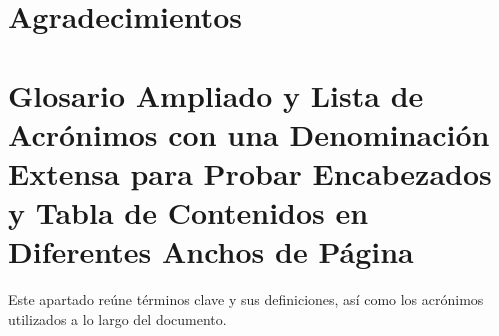 \chapter{Agradecimientos}

\chapter*{Glosario Ampliado y Lista de Acrónimos con una Denominación Extensa para Probar Encabezados y Tabla de Contenidos en Diferentes Anchos de Página}
Este apartado reúne términos clave y sus definiciones, así como los acrónimos utilizados a lo largo del documento.
